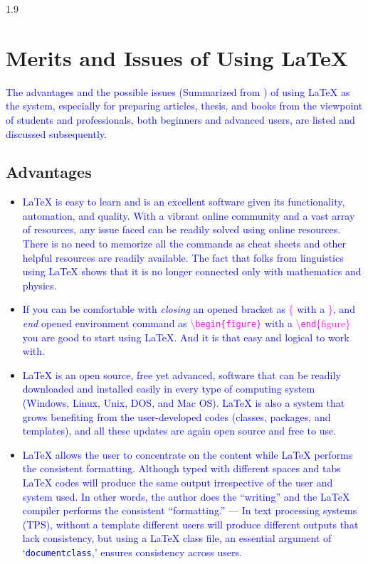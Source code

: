 \documentclass[phd]{ndsu-thesis-2022}
\newcommand\myspacing{1.9} %
\newcommand\italk[1]{\textcolor{blue}{#1}}  %
\newcommand\cmd[1]{\textbackslash\texttt{#1}}  %
\newcommand\lx{\LaTeX\xspace}
\newcommand\vb[1]{\textcolor{blue}{\texttt{#1}}}%
\begin{document}
\begin{spacing}{\myspacing}
\kant[9]

\section{Merits and Issues of Using \lx}
\italk{The advantages and the possible issues (Summarized from \citet{cannayen2011latex}) of using \lx as the system, especially for preparing articles, thesis, and books from the viewpoint of students and professionals, both beginners and advanced users, are listed and discussed subsequently.} 

\subsection{Advantages}
\begin{itemize}[leftmargin=*, itemsep=0pt, parsep=3pt] 

\item \italk{\lx is easy to learn and is an excellent software given its functionality, automation, and quality. With a vibrant online community and a vast array of resources, any issue faced can be readily solved using online resources. There is no need to memorize all the commands as cheat sheets and other helpful resources are readily available. The fact that folks from linguistics using \lx shows that it is no longer connected only with mathematics and physics.} 

\item \italk{ If you can be comfortable with \emph{closing} an opened bracket as \textcolor{magenta}{\{} with a \textcolor{magenta}{\}}, and \emph{end} opened environment command as \textcolor{magenta}{\cmd{begin\{figure\}}} with a  \textcolor{magenta}{\cmd{end}\{figure\}} you are good to start using \lx. And it is that easy and logical to work with.}

\item \italk{\lx is an open source, free yet advanced, software that can be readily downloaded and installed easily in every type of computing system (Windows, Linux, Unix, DOS, and Mac OS). \lx is also a system that grows benefiting from the user-developed codes (classes, packages, and templates), and all these updates are again open source and free to use.}  

\item \italk{\lx allows the user to concentrate on the content while \lx performs the consistent formatting. Although typed with different spaces and tabs \lx codes will produce the same output irrespective of the user and system used. In other words, the author does the ``writing'' and the \lx compiler performs the consistent ``formatting.'' --- In text processing systems (TPS), without a template different users will produce different outputs that lack consistency, but using a \lx class file, an essential argument of `\vb{documentclass},' ensures consistency across users.}  


\end{itemize}
\end{spacing}
\end{document}
